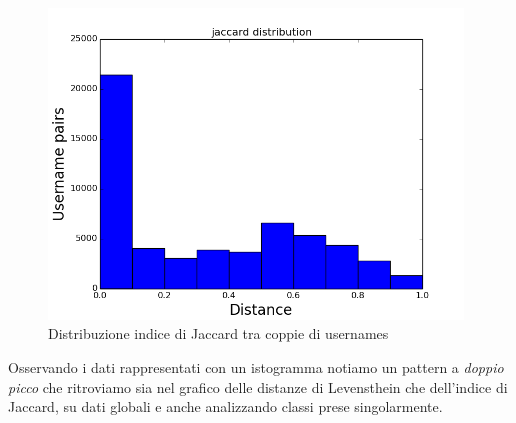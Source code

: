 \begin{figure}[bp!]
\centering
\includegraphics[width=110mm]{chapters/distanceplot/jaccard_distribution.png}
\caption{Distribuzione indice di Jaccard tra coppie di usernames \label{overflow}}
\end{figure}

\newpage

Osservando i dati rappresentati con un istogramma notiamo un pattern a \textit{doppio picco} che ritroviamo sia nel grafico delle distanze di Levensthein che dell'indice di Jaccard, su dati globali e anche analizzando classi prese singolarmente.


